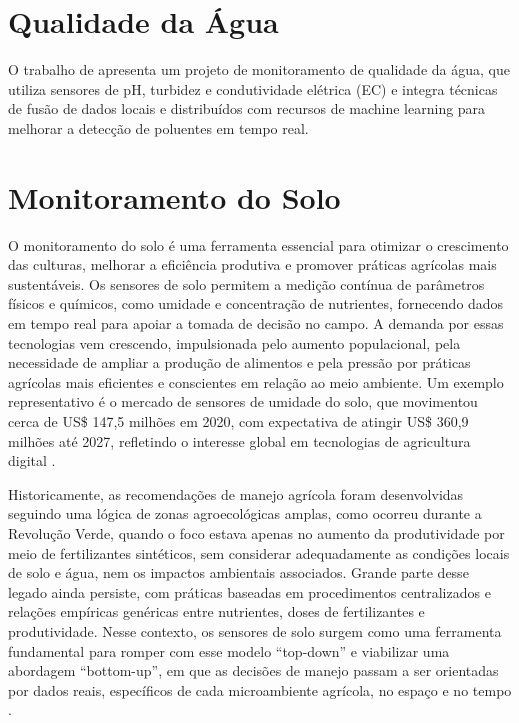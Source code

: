 \section{Qualidade da Água}
O trabalho de \textcite{ferreira_2023_conception} apresenta um projeto de monitoramento de qualidade da água, que utiliza sensores de pH, turbidez e condutividade elétrica (EC) e integra técnicas de fusão de dados locais e distribuídos com recursos de machine learning para melhorar a detecção de poluentes em tempo real. 

\section{Monitoramento do Solo}

O monitoramento do solo é uma ferramenta essencial para otimizar o crescimento das culturas, melhorar a eficiência produtiva e promover práticas agrícolas mais sustentáveis. Os sensores de solo permitem a medição contínua de parâmetros físicos e químicos, como umidade e concentração de nutrientes, fornecendo dados em tempo real para apoiar a tomada de decisão no campo. A demanda por essas tecnologias vem crescendo, impulsionada pelo aumento populacional, pela necessidade de ampliar a produção de alimentos e pela pressão por práticas agrícolas mais eficientes e conscientes em relação ao meio ambiente. Um exemplo representativo é o mercado de sensores de umidade do solo, que movimentou cerca de US\$ 147{,}5 milhões em 2020, com expectativa de atingir US\$ 360{,}9 milhões até 2027, refletindo o interesse global em tecnologias de agricultura digital \cite{yin_2021_smart} .

Historicamente, as recomendações de manejo agrícola foram desenvolvidas seguindo uma lógica de zonas agroecológicas amplas, como ocorreu durante a Revolução Verde, quando o foco estava apenas no aumento da produtividade por meio de fertilizantes sintéticos, sem considerar adequadamente as condições locais de solo e água, nem os impactos ambientais associados. Grande parte desse legado ainda persiste, com práticas baseadas em procedimentos centralizados e relações empíricas genéricas entre nutrientes, doses de fertilizantes e produtividade. Nesse contexto, os sensores de solo surgem como uma ferramenta fundamental para romper com esse modelo “top-down” e viabilizar uma abordagem “bottom-up”, em que as decisões de manejo passam a ser orientadas por dados reais, específicos de cada microambiente agrícola, no espaço e no tempo \cite{viscarrarossel_2016_soil}.

